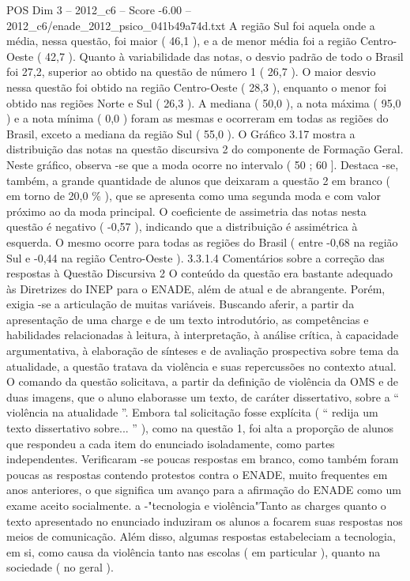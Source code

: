 \begin{textsample}{POS Dim 3 – 2012\_c6 – Score -6.00 – 2012\_c6/enade\_2012\_psico\_041b49a74d.txt}
A região Sul foi aquela onde a média, nessa questão, foi maior ( 46,1 ), e a de menor média foi a região Centro-Oeste ( 42,7 ).
Quanto à variabilidade das notas, o desvio padrão de todo o Brasil foi 27,2, superior ao obtido na questão de número 1 ( 26,7 ).
O maior desvio nessa questão foi obtido na região Centro-Oeste ( 28,3 ), enquanto o menor foi obtido nas regiões Norte e Sul ( 26,3 ).
A mediana ( 50,0 ), a nota máxima ( 95,0 ) e a nota mínima ( 0,0 ) foram as mesmas e ocorreram em todas as regiões do Brasil, exceto a mediana da região Sul ( 55,0 ).
O Gráfico 3.17 mostra a distribuição das notas na questão discursiva 2 do componente de Formação Geral.
Neste gráfico, observa -se que a moda ocorre no intervalo ( 50 ; 60 ].
Destaca -se, também, a grande quantidade de alunos que deixaram a questão 2 em branco ( em torno de 20,0 \% ), que se apresenta como uma segunda moda e com valor próximo ao da moda principal.
O coeficiente de assimetria das notas nesta questão é negativo ( -0,57 ), indicando que a distribuição é assimétrica à esquerda.
O mesmo ocorre para todas as regiões do Brasil ( entre -0,68 na região Sul e -0,44 na região Centro-Oeste ). 3.3.1.4 Comentários sobre a correção das respostas à Questão Discursiva 2 O conteúdo da questão era bastante adequado às Diretrizes do INEP para o ENADE, além de atual e de abrangente.
Porém, exigia -se a articulação de muitas variáveis.
Buscando aferir, a partir da apresentação de uma charge e de um texto introdutório, as competências e habilidades relacionadas à leitura, à interpretação, à análise crítica, à capacidade argumentativa, à elaboração de sínteses e de avaliação prospectiva sobre tema da atualidade, a questão tratava da violência e suas repercussões no contexto atual.
O comando da questão solicitava, a partir da definição de violência da OMS e de duas imagens, que o aluno elaborasse um texto, de caráter dissertativo, sobre a “ violência na atualidade ”.
Embora tal solicitação fosse explícita ( “ redija um texto dissertativo sobre... ” ), como na questão 1, foi alta a proporção de alunos que respondeu a cada item do enunciado isoladamente, como partes independentes.
Verificaram -se poucas respostas em branco, como também foram poucas as respostas contendo protestos contra o ENADE, muito frequentes em anos anteriores, o que significa um avanço para a afirmação do ENADE como um exame aceito socialmente. a -"tecnologia e violência"Tanto as charges quanto o texto apresentado no enunciado induziram os alunos a focarem suas respostas nos meios de comunicação.
Além disso, algumas respostas estabeleciam a tecnologia, em si, como causa da violência tanto nas escolas ( em particular ), quanto na sociedade ( no geral ).

\end{textsample}

